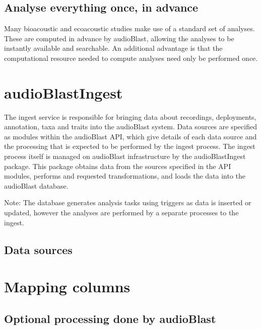 \documentclass[
]{book}
\begin{document}
\hypertarget{analyse-everything-once-in-advance}{%
\section{Analyse everything once, in advance}\label{analyse-everything-once-in-advance}}

Many bioacoustic and ecoacoustic studies make use of a standard set of analyses. These are computed in advance by audioBlast, allowing the analyses to be instantly available and searchable. An additional advantage is that the computational resource needed to compute analyses need only be performed once.

\hypertarget{audioblastingest}{%
\chapter{audioBlastIngest}\label{audioblastingest}}

The ingest service is responsible for bringing data about recordings, deployments, annotation, taxa and traits into the audioBlast system. Data sources are specified as modules within the audioBlast API, which give details of each data source and the processing that is expected to be performed by the ingest process. The ingest process itself is managed on audioBlast infrastructure by the audioBlastIngest package. This package obtains data from the sources specified in the API modules, performs and requested transformations, and loads the data into the audioBlast database.

Note: The database generates analysis tasks using triggers as data is inserted or updated, however the analyses are performed by a separate processes to the ingest.

\hypertarget{data-sources}{%
\section{Data sources}\label{data-sources}}

\hypertarget{mapping-columns}{%
\chapter{Mapping columns}\label{mapping-columns}}

\hypertarget{optional-processing-done-by-audioblast}{%
\section{Optional processing done by audioBlast}\label{optional-processing-done-by-audioblast}}
\end{document}
